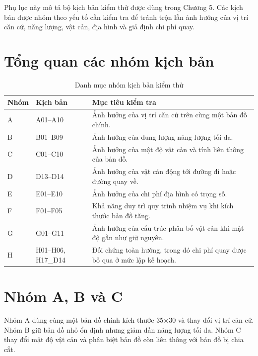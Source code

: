 \documentclass[../DoAn.tex]{subfiles}
\begin{document}
Phụ lục này mô tả bộ kịch bản kiểm thử được dùng trong Chương 5. Các kịch bản được nhóm theo yếu tố cần kiểm tra để tránh trộn lẫn ảnh hưởng của vị trí căn cứ, năng lượng, vật cản, địa hình và giả định chi phí quay.

\section{Tổng quan các nhóm kịch bản}

\begin{table}[H]
\centering
\caption{Danh mục nhóm kịch bản kiểm thử}
\small
\setlength{\tabcolsep}{4pt}
\renewcommand{\arraystretch}{1.08}
\begin{tabular}{|C{0.10\textwidth}|L{0.22\textwidth}|L{0.58\textwidth}|}
\hline
\textbf{Nhóm} & \textbf{Kịch bản} & \textbf{Mục tiêu kiểm tra} \\
\hline
A & A01--A10 & Ảnh hưởng của vị trí căn cứ trên cùng một bản đồ chính. \\
\hline
B & B01--B09 & Ảnh hưởng của dung lượng năng lượng tối đa. \\
\hline
C & C01--C10 & Ảnh hưởng của mật độ vật cản và tính liên thông của bản đồ. \\
\hline
D & D13--D14 & Ảnh hưởng của vật cản động tới đường đi hoặc đường quay về. \\
\hline
E & E01--E10 & Ảnh hưởng của chi phí địa hình có trọng số. \\
\hline
F & F01--F05 & Khả năng duy trì quy trình nhiệm vụ khi kích thước bản đồ tăng. \\
\hline
G & G01--G11 & Ảnh hưởng của cấu trúc phân bố vật cản khi mật độ gần như giữ nguyên. \\
\hline
H & H01--H06, H17\_D14 & Đối chứng toàn hướng, trong đó chi phí quay được bỏ qua ở mức lập kế hoạch. \\
\hline
\end{tabular}
\end{table}

\section{Nhóm A, B và C}

Nhóm A dùng cùng một bản đồ chính kích thước 35$\times$30 và thay đổi vị trí căn cứ. Nhóm B giữ bản đồ nhỏ ổn định nhưng giảm dần năng lượng tối đa. Nhóm C thay đổi mật độ vật cản và phân biệt bản đồ còn liên thông với bản đồ bị chia cắt.
\end{document}
